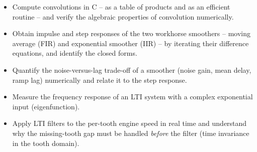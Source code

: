 
\begin{goals}
\begin{itemize}
  \item Compute convolutions in C -- as a table of products and as an
    efficient routine -- and verify the algebraic properties of convolution
    numerically.
  \item Obtain impulse and step responses of the two workhorse smoothers --
    moving average (FIR) and exponential smoother (IIR) -- by iterating their
    difference equations, and identify the closed forms.
  \item Quantify the noise-versus-lag trade-off of a smoother (noise gain,
    mean delay, ramp lag) numerically and relate it to the step response.
  \item Measure the frequency response of an LTI system with a complex
    exponential input (eigenfunction).
  \item Apply LTI filters to the per-tooth engine speed in real time and
    understand why the missing-tooth gap must be handled \emph{before} the
    filter (time invariance in the tooth domain).
\end{itemize}
\end{goals}


